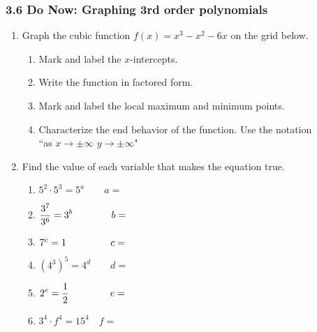\documentclass[12pt, twoside]{article}
\begin{document}
\subsubsection*{3.6 Do Now: Graphing 3rd order polynomials}
\begin{enumerate}
  \item Graph the cubic function $f(x) = x^{3}-x^{2}-6x$ on the grid below. 
\begin{enumerate}
    \item Mark and label the $x$-intercepts. 
    \item Write the function in factored form. \vspace{1.5cm}
    \item Mark and label the local maximum and minimum points.
    \item Characterize the end behavior of the function. Use the notation \\
    ``as $x \rightarrow \pm \infty$ $y \rightarrow\pm \infty$"
\end{enumerate}
      \hspace{2cm}
  
    \begin{center}
    \end{center}

\newpage

\item Find the value of each variable that makes the equation true.
\begin{multicols}{2}
\begin{enumerate}[itemsep=0.5cm]
    \item $5^2 \cdot 5^3 = 5^a \qquad a=$
    \item $\displaystyle \frac{3^7}{3^6} = 3^b \hspace{1.4cm}  b=$
    \item $7^c=1 \hspace{1.6cm} c=$
    \item $(4^3)^5 = 4^d \qquad d=$
    \item $\displaystyle 2^e = \frac{1}{2} \hspace{1.5cm}  e=$
    \item $3^4 \cdot f^4 = 15^4 \quad f=$
\end{enumerate}
\end{multicols} \vspace{0.5cm}


\end{enumerate}
\end{document}
